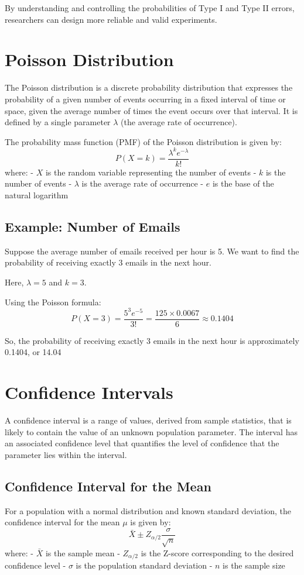 \documentclass{article}
\begin{document}
By understanding and controlling the probabilities of Type I and Type II errors, researchers can design more reliable and valid experiments.

\section{Poisson Distribution}
The Poisson distribution is a discrete probability distribution that expresses the probability of a given number of events occurring in a fixed interval of time or space, given the average number of times the event occurs over that interval. It is defined by a single parameter \(\lambda\) (the average rate of occurrence).

The probability mass function (PMF) of the Poisson distribution is given by:
\[
P(X = k) = \frac{\lambda^k e^{-\lambda}}{k!}
\]
where:
- \(X\) is the random variable representing the number of events
- \(k\) is the number of events
- \(\lambda\) is the average rate of occurrence
- \(e\) is the base of the natural logarithm

\subsection{Example: Number of Emails}
Suppose the average number of emails received per hour is 5. We want to find the probability of receiving exactly 3 emails in the next hour.

Here, \(\lambda = 5\) and \(k = 3\).

Using the Poisson formula:
\[
P(X = 3) = \frac{5^3 e^{-5}}{3!} = \frac{125 \times 0.0067}{6} \approx 0.1404
\]

So, the probability of receiving exactly 3 emails in the next hour is approximately 0.1404, or 14.04%

\section{Confidence Intervals}
A confidence interval is a range of values, derived from sample statistics, that is likely to contain the value of an unknown population parameter. The interval has an associated confidence level that quantifies the level of confidence that the parameter lies within the interval.

\subsection{Confidence Interval for the Mean}
For a population with a normal distribution and known standard deviation, the confidence interval for the mean \(\mu\) is given by:
\[
\bar{X} \pm Z_{\alpha/2} \frac{\sigma}{\sqrt{n}}
\]
where:
- \(\bar{X}\) is the sample mean
- \(Z_{\alpha/2}\) is the Z-score corresponding to the desired confidence level
- \(\sigma\) is the population standard deviation
- \(n\) is the sample size
\end{document}
